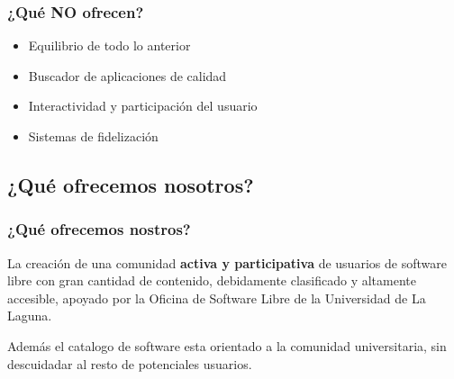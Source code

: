 	\begin{frame}
		\frametitle{¿Qué NO ofrecen?}
		\begin{itemize}
			\item <1-| alert@1> Equilibrio de todo lo anterior
			\item <2-| alert@2> Buscador de aplicaciones de calidad
			\item <3-| alert@3> Interactividad y participación del usuario
			\item <4-| alert@4> Sistemas de fidelización
		\end{itemize}
	\end{frame}


	\subsection{¿Qué ofrecemos nosotros?} %
	\begin{frame}
		\frametitle{¿Qué ofrecemos nostros?}
		La creación de una comunidad \textbf{activa y participativa} de usuarios de software libre con gran cantidad de contenido, debidamente clasificado y altamente accesible, apoyado por la Oficina de Software Libre de la Universidad de La Laguna.

		Además el catalogo de software esta orientado a la comunidad universitaria, sin descuidadar al resto de potenciales usuarios.
	\end{frame}